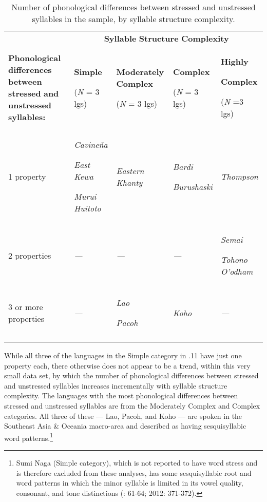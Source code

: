 \begin{table}
\begin{tabularx}{\textwidth}{XXXXX}
\lsptoprule
 & \multicolumn{4}{c}{ \textbf{Syllable} \textbf{Structure} \textbf{Complexity}}\\
 \textbf{Phonological} \textbf{differences} \textbf{between} \textbf{stressed} \textbf{and} \textbf{unstressed} \textbf{syllables:} & { \textbf{Simple}}

 (\textit{N} = 3 lgs) & { \textbf{Moderately} \textbf{Complex}}

 (\textit{N} = 3 lgs) & { \textbf{Complex}}

 (\textit{N} = 3 lgs) & { \textbf{Highly} }

{ \textbf{Complex}}

 (\textit{N} =3 lgs)\\
 1 property & { \textit{Cavineña}}

{ \textit{East} \textit{Kewa}}

 \textit{Murui} \textit{Huitoto} & \textit{Eastern} \textit{Khanty} & { \textit{Bardi}}

 \textit{Burushaski} & \textit{Thompson}\\
 2 properties & \textit{—} & \textit{—} & \textit{—} & { \textit{Semai}}

 \textit{Tohono} \textit{O’odham}\\
 3 or more properties & \textit{—} & { \textit{Lao}}

 \textit{Pacoh} & \textit{Koho} & \textit{—}\\
\lspbottomrule
\end{tabularx}
\caption{\label{5.11}Number of phonological differences between stressed and unstressed syllables in the sample, by syllable structure complexity.}
\end{table}

  While all three of the languages in the Simple category in .11 have just one property each, there otherwise does not appear to be a trend, within this very small data set, by which the number of phonological differences between stressed and unstressed syllables increases incrementally with syllable structure complexity. The languages with the most phonological differences between stressed and unstressed syllables are from the Moderately Complex and Complex categories. All three of these — Lao, Pacoh, and Koho — are spoken in the Southeast Asia \& Oceania macro-area and described as having sesquisyllabic word patterns.\footnote{ \textrm{Sumi Naga (Simple category), which is not reported to have word stress and is therefore excluded from these analyses, has some sesquisyllabic root and word patterns in which the minor syllable is limited in its vowel quality, consonant, and tone distinctions (\citealt{Teo2009}: 61-64; 2012: 371-372).}} 

